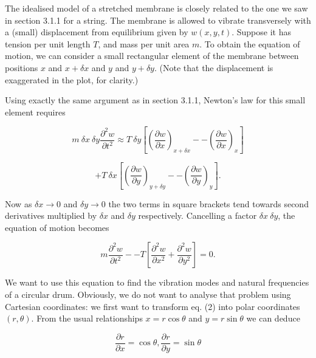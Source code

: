   The idealised model of a stretched membrane is closely related to the one we 
  saw in section 3.1.1 for a string. The membrane is allowed to vibrate 
  transversely with a (small) displacement from equilibrium given by 
  $w(x,y,t)$. Suppose it has tension per unit length $T$, and mass per unit 
  area $m$. To obtain the equation of motion, we can consider a small 
  rectangular element of the membrane between positions $x$ and $x+ \delta x$ 
  and $y$ and $y+ \delta y$. (Note that the displacement is exaggerated in the 
  plot, for clarity.) 


  Using exactly the same argument as in section 3.1.1, Newton's law for this 
  small element requires 

  \begin{equation*}m~\delta x~\delta y \frac{\partial^2 w}{\partial t^2} 
  \approx T~\delta y \left[ \left( \frac{\partial w}{\partial x} \right) _{x + 
  \delta x} -- \left( \frac{\partial w}{\partial x} \right) _{x} \right] 
  \end{equation*} 

  \begin{equation*}+ T~\delta x \left[ \left( \frac{\partial w}{\partial y} 
  \right) _{y + \delta y} -- \left( \frac{\partial w}{\partial y} \right) _{y} 
  \right] .\tag{1}\end{equation*} 

  Now as $\delta x \rightarrow 0$ and $\delta y \rightarrow 0$ the two terms in 
  square brackets tend towards second derivatives multiplied by $\delta x$ and 
  $\delta y$ respectively. Cancelling a factor $\delta x ~ \delta y$, the 
  equation of motion becomes 

  \begin{equation*}m \frac{\partial^2 w}{\partial t^2} -- T \left[ 
  \dfrac{\partial^2 w}{\partial x^2} + \dfrac{\partial^2 w}{\partial y^2} 
  \right] =0 .\tag{2}\end{equation*} 

  We want to use this equation to find the vibration modes and natural 
  frequencies of a circular drum. Obviously, we do not want to analyse that 
  problem using Cartesian coordinates: we first want to transform eq. (2) into 
  polar coordinates $(r, \theta)$. From the usual relationships $x=r \cos 
  \theta$ and $y = r \sin \theta$ we can deduce 

  \begin{equation*}\frac{\partial r}{\partial x} = \cos \theta, \frac{\partial 
  r}{\partial y} = \sin \theta \tag{3}\end{equation*} 

